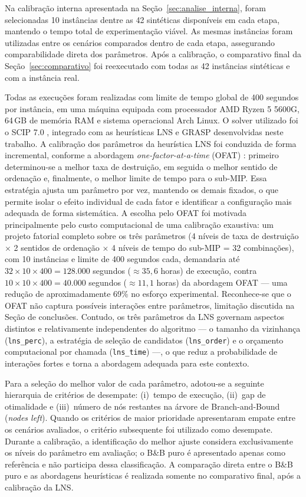 Na calibração interna apresentada na Seção~\ref{sec:analise_interna}, foram selecionadas 10 instâncias dentre as 42 sintéticas disponíveis em cada etapa, mantendo o tempo total de experimentação viável. As mesmas instâncias foram utilizadas entre os cenários comparados dentro de cada etapa, assegurando comparabilidade direta dos parâmetros. Após a calibração, o comparativo final da Seção~\ref{sec:comparativo} foi reexecutado com todas as 42 instâncias sintéticas e com a instância real.

Todas as execuções foram realizadas com limite de tempo global de 400 segundos por instância, em uma máquina equipada com processador AMD Ryzen 5 5600G, 64\,GB de memória RAM e sistema operacional Arch Linux. O solver utilizado foi o SCIP 7.0 \cite{gamrath_2020_scip}, integrado com as heurísticas LNS e GRASP desenvolvidas neste trabalho. A calibração dos parâmetros da heurística LNS foi conduzida de forma incremental, conforme a abordagem \emph{one-factor-at-a-time} (OFAT) \cite{montgomery_2017}: primeiro determinou-se a melhor taxa de destruição, em seguida o melhor sentido de ordenação e, finalmente, o melhor limite de tempo para o sub-MIP. Essa estratégia ajusta um parâmetro por vez, mantendo os demais fixados, o que permite isolar o efeito individual de cada fator e identificar a configuração mais adequada de forma sistemática. A escolha pelo OFAT foi motivada principalmente pelo custo computacional de uma calibração exaustiva: um projeto fatorial completo sobre os três parâmetros (4 níveis de taxa de destruição $\times$ 2 sentidos de ordenação $\times$ 4 níveis de tempo do sub-MIP = 32 combinações), com 10 instâncias e limite de 400 segundos cada, demandaria até $32 \times 10 \times 400 = 128.000$ segundos ($\approx 35{,}6$ horas) de execução, contra $10 \times 10 \times 400 = 40.000$ segundos ($\approx 11{,}1$ horas) da abordagem OFAT --- uma redução de aproximadamente 69\% no esforço experimental. Reconhece-se que o OFAT não captura possíveis interações entre parâmetros, limitação discutida na Seção de conclusões. Contudo, os três parâmetros da LNS governam aspectos distintos e relativamente independentes do algoritmo --- o tamanho da vizinhança (\texttt{lns\_perc}), a estratégia de seleção de candidatos (\texttt{lns\_order}) e o orçamento computacional por chamada (\texttt{lns\_time}) ---, o que reduz a probabilidade de interações fortes e torna a abordagem adequada para este contexto.

Para a seleção do melhor valor de cada parâmetro, adotou-se a seguinte hierarquia de critérios de desempate: (i)~tempo de execução, (ii)~gap de otimalidade e (iii)~número de nós restantes na árvore de Branch-and-Bound (\emph{nodes left}). Quando os critérios de maior prioridade apresentaram empate entre os cenários avaliados, o critério subsequente foi utilizado como desempate. Durante a calibração, a identificação do melhor ajuste considera exclusivamente os níveis do parâmetro em avaliação; o B\&B puro é apresentado apenas como referência e não participa dessa classificação. A comparação direta entre o B\&B puro e as abordagens heurísticas é realizada somente no comparativo final, após a calibração da LNS.

